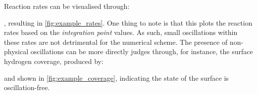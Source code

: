 \documentclass[3p]{elsarticle} %
\begin{document}
Reaction rates can be visualised through:

, resulting in \cref{fig:example_rates}. One thing to note is that this plots the reaction rates based on the \textit{integration point} values. As such, small oscillations within these rates are not detrimental for the numerical scheme. The presence of non-physical oscillations can be more directly judges through, for instance, the surface hydrogen coverage, produced by:

 and shown in \cref{fig:example_coverage}, indicating the state of the surface is oscillation-free.


\end{document}
